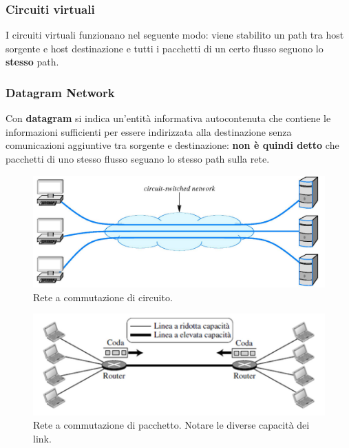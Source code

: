 \documentclass[11pt,a4paper,oneside]{book}
\theoremstyle{definition}
\begin{document}
\subsubsection{Circuiti virtuali}
I circuiti virtuali funzionano nel seguente modo: viene stabilito un path tra host sorgente e host destinazione e tutti i pacchetti di un certo flusso seguono lo \textbf{stesso} path.

\pagebreak

\subsubsection{Datagram Network}
Con \textbf{datagram} si indica un'entità informativa autocontenuta che contiene le informazioni sufficienti per essere indirizzata alla destinazione senza comunicazioni aggiuntive tra sorgente e destinazione: \textbf{non è quindi detto} che pacchetti di uno stesso flusso seguano lo stesso path sulla rete.
\begin{figure}[!h]
	\includegraphics[scale=0.17]{Immagini/Circuit_switch.png}
	\centering
	\caption{Rete a commutazione di circuito.}
\end{figure}
\begin{figure}[!h]
	\includegraphics[scale=0.5]{Immagini/Packet_Switch.png}
	\centering
	\caption{Rete a commutazione di pacchetto. Notare le diverse capacità dei link.}
\end{figure}
\end{document}
